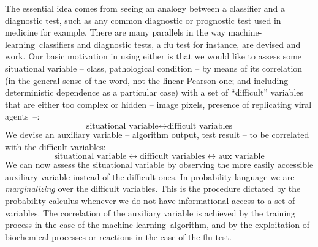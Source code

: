 \documentclass[\ifafour a4paper,12pt,\else a5paper,10pt,\fi%
onecolumn,oneside,article,%
british%
]{memoir}
\theoremstyle{remark}
\theoremstyle{innote}
\renewcommand*{\|}[1][]{\nonscript\:#1\vert\nonscript\:\mathopen{}}
\newcommand*{\ml}{machine-learning}
\begin{document}
The essential idea comes from seeing an analogy between a classifier and a diagnostic test, such as any common diagnostic or prognostic test used in medicine for example. There are many parallels in the way \ml\ classifiers and diagnostic tests, a flu test for instance, are devised and work. Our basic motivation in using either is that we would like to assess some situational variable -- class, pathological condition -- by means of its correlation (in the general sense of the word, not the linear Pearson one; and including deterministic dependence as a particular case) with a set of \enquote{difficult} variables that are either too complex or hidden -- image pixels, presence of replicating viral agents~--:
\[
  \text{situational variable} \longleftrightarrow \text{difficult variables}
\]
We devise an auxiliary variable -- algorithm output, test result -- to be correlated with the difficult variables:
\[
    \text{situational variable} \longleftrightarrow \text{difficult variables}
    \longleftrightarrow \text{aux variable}
\]
We can now assess the situational variable by observing the more easily accessible auxiliary variable instead of the difficult ones. In probability language we are \emph{marginalizing} over the difficult variables. This is the procedure dictated by the probability calculus whenever we do not have informational access to a set of variables. The correlation of the auxiliary variable is achieved by the training process in the case of the \ml\ algorithm, and by the exploitation of biochemical processes or reactions in the case of the flu test.
\end{document}
